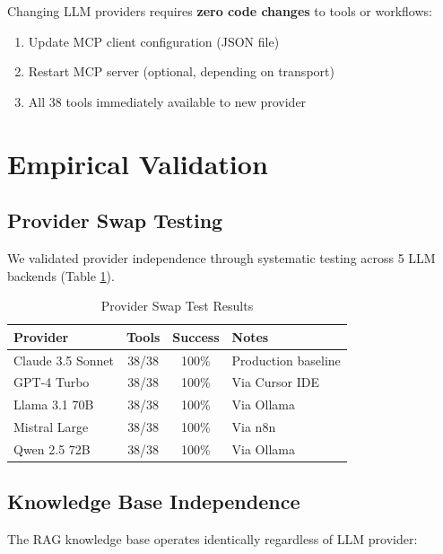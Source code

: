\documentclass[11pt,twocolumn]{article}
\begin{document}
Changing LLM providers requires \textbf{zero code changes} to tools or workflows:

\begin{enumerate}
    \item Update MCP client configuration (JSON file)
    \item Restart MCP server (optional, depending on transport)
    \item All 38 tools immediately available to new provider
\end{enumerate}

\section{Empirical Validation}

\subsection{Provider Swap Testing}

We validated provider independence through systematic testing across 5 LLM backends (Table \ref{tab:provider-test}).

\begin{table}[h]
\centering
\caption{Provider Swap Test Results}
\label{tab:provider-test}
\scriptsize
\begin{tabular}{@{}lccl@{}}
\toprule
\textbf{Provider} & \textbf{Tools} & \textbf{Success} & \textbf{Notes} \\
\midrule
Claude 3.5 Sonnet & 38/38 & 100\% & Production baseline \\
GPT-4 Turbo & 38/38 & 100\% & Via Cursor IDE \\
Llama 3.1 70B & 38/38 & 100\% & Via Ollama \\
Mistral Large & 38/38 & 100\% & Via n8n \\
Qwen 2.5 72B & 38/38 & 100\% & Via Ollama \\
\bottomrule
\end{tabular}
\end{table}

\subsection{Knowledge Base Independence}

The RAG knowledge base operates identically regardless of LLM provider:
\end{document}

